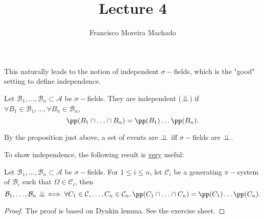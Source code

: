 \documentclass[../main.tex]{subfiles}
\author{Francisco Moreira Machado}
\title{Lecture 4}
\begin{document}
  This naturally leads to the notion of independent $\sigma-$fields, which is the "good"
  setting to define independence.

  \begin{definition}
      Let $\mathcal{B}_1 ,\ldots, \mathcal{B}_n \subset \mathcal{A}$ be $\sigma-$fields. They
      are independent ($\perp\!\!\!\!\,\perp$) if $\forall B_1 \in \mathcal{B}_1, \ldots, \forall B_n \in
      \mathcal{B}_n$, 
      \[
      \pp(B_1 \cap \ldots \cap B_n) = \pp(B_1)\ldots\pp(B_n)
      .\] 
  \end{definition}
  By the proposition just above, a set of events are $\perp\!\!\!\!\,\perp$ iff $\sigma-$fields are $\perp\!\!\!\!\,\perp$.

  \vspace{0.5em}

  To show independence, the following result is \underline{very} useful:
  \begin{proposition}
      Let $\mathcal{B}_1,\ldots, \mathcal{B}_n \subset \mathcal{A}$ be $\sigma-$fields. For $1
      \leq i \leq n$, let $\mathcal{C}_i$ be a generating $\pi-$system of $\mathcal{B}_i$ such
      that $\Omega \in \mathcal{C}_i$, then 
      \[
      \mathcal{B}_1, \ldots, \mathcal{B}_n \indep \iff \forall C_1 \in \mathcal{C}, \ldots, C_n
      \in \mathcal{C}_n, \pp(C_1 \cap \ldots \cap C_n) = \pp(C_1) \ldots \pp(C_n)
      .\] 
  \end{proposition}
  \begin{proof}
    The proof is based on Dynkin lemma. See the exercise sheet.
  \end{proof}
\end{document}
